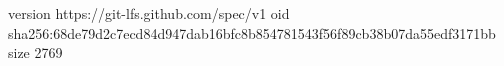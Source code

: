 version https://git-lfs.github.com/spec/v1
oid sha256:68de79d2c7ecd84d947dab16bfc8b854781543f56f89cb38b07da55edf3171bb
size 2769

